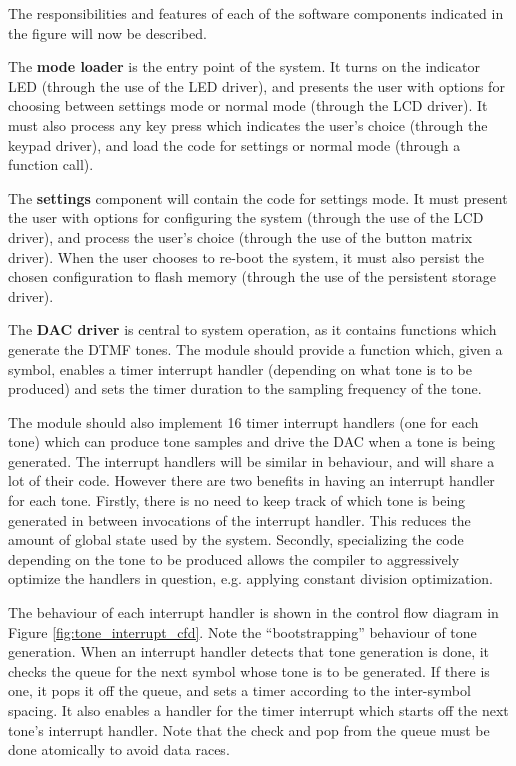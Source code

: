 \documentclass[11pt,a4paper,twocolumn]{scrartcl}
\begin{document}
The responsibilities and features of each of the software components indicated in the figure will now be described.

The \textbf{mode loader} is the entry point of the system. It turns on the indicator LED (through the use of the LED driver), and presents the user with options
for choosing between settings mode or normal mode (through the LCD driver). It must also process any key press which indicates the user's choice 
(through the keypad driver), and load the code for settings or normal mode (through a function call).

The \textbf{settings} component will contain the code for settings mode. It must present the user with options for configuring the system (through the use of the
LCD driver), and process the user's choice (through the use of the button matrix driver). When the user chooses to re-boot the system, it must also persist the
chosen configuration to flash memory (through the use of the persistent storage driver).

The \textbf{DAC driver} is central to system operation, as it contains functions which generate the DTMF tones. The module should provide a function which, 
given a symbol, enables a timer interrupt handler (depending on what tone is to be produced) and sets the timer duration to the sampling frequency of the tone.

The module should also implement 16 timer interrupt handlers (one for each tone) which can produce tone samples and 
drive the DAC when a tone is being generated. The interrupt handlers will be similar in behaviour, and will share a lot of their code. However
there are two benefits in having an interrupt handler for each tone. Firstly, there is no need to keep track of which tone is being generated in between invocations
of the interrupt handler. This reduces the amount of global state used by the system. Secondly, specializing the code depending on the tone to be produced allows the
compiler to aggressively optimize the handlers in question, e.g. applying constant division optimization.

The behaviour of each interrupt handler is shown in the control flow diagram in Figure \ref{fig:tone_interrupt_cfd}. Note the ``bootstrapping'' behaviour of tone
generation. When an interrupt handler detects that tone generation is done, it checks the queue for the next symbol whose tone is to be generated. 
If there is one, it pops it off the queue, and sets a timer according to the inter-symbol spacing. It also enables a handler for the timer interrupt which
starts off the next tone's interrupt handler. Note that the check and pop from the queue must be done atomically to avoid data races.
\end{document}
